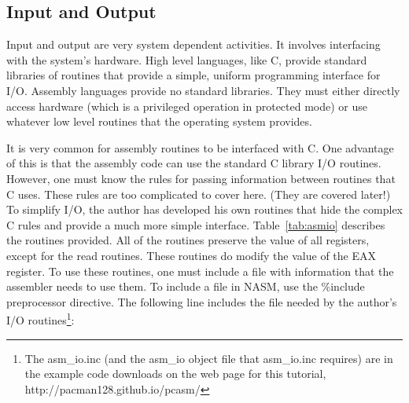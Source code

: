 \subsection{Input and Output }

Input and output are very system dependent activities. It involves
interfacing with the system's hardware. High level languages, like C,
provide standard libraries of routines that provide a simple, uniform
programming interface for I/O.  Assembly languages provide no standard
libraries. They must either directly access hardware (which is a privileged
operation in protected mode) or use whatever low level routines that the
operating system provides.

It is very common for assembly routines to be interfaced with C. One
advantage of this is that the assembly code can use the standard C
library I/O routines.  However, one must know the rules for passing
information between routines that C uses. These rules are too
complicated to cover here. (They are covered later!) To simplify I/O,
the author has developed his own routines that hide the complex C
rules and provide a much more simple interface.  Table~\ref{tab:asmio}
describes the routines provided. All of the routines preserve the
value of all registers, except for the read routines. These routines
do modify the value of the EAX register. To use these routines, one
must include a file with information that the assembler needs to use
them.  To include a file in NASM, use the {\code \%include}
preprocessor directive. The following line includes the file needed by
the author's I/O routines\footnote{The {\code asm\_io.inc} (and the
{\code asm\_io} object file that {\code asm\_io.inc} requires) are in
the example code downloads on the web page for this tutorial, {\code
http://pacman128.github.io/pcasm/}}:
\begin{AsmCodeListing}[frame=none, numbers=none]
\end{AsmCodeListing}

